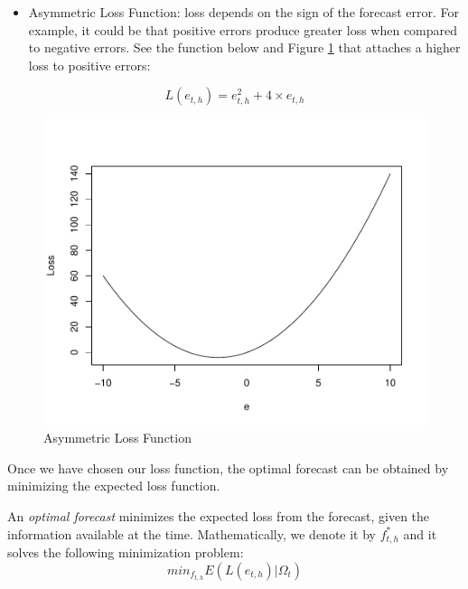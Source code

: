 \documentclass[]{book}
\providecommand{\tightlist}{%
  \setlength{\itemsep}{0pt}\setlength{\parskip}{0pt}}
\theoremstyle{definition}
\theoremstyle{definition}
\theoremstyle{definition}
\theoremstyle{remark}
\let\BeginKnitrBlock\begin \let\EndKnitrBlock\end
\begin{document}
\begin{itemize}
\tightlist
\item
  Asymmetric Loss Function: loss depends on the sign of the forecast error. For example, it could be that positive errors produce greater loss when compared to negative errors. See the function below and Figure \ref{fig:ch1-figure6} that attaches a higher loss to positive errors:
\end{itemize}

\begin{equation}
L(e_{t,h})=e_{t,h}^2+4 \times e_{t,h}
\end{equation}

\begin{figure}

{\centering \includegraphics[width=0.8\linewidth]{bookdown-demo_files/figure-latex/ch1-figure6-1} 

}

\caption{Asymmetric Loss Function}\label{fig:ch1-figure6}
\end{figure}

Once we have chosen our loss function, the optimal forecast can be obtained by minimizing the expected loss function.

\BeginKnitrBlock{definition}[Optimal Forecast]
\protect\hypertarget{def:d6}{}{\label{def:d6} {} }
\EndKnitrBlock{definition}

An \emph{optimal forecast} minimizes the expected loss from the forecast, given the information available at the time. Mathematically, we denote it by \(f^*_{t,h}\) and it solves the following minimization problem:
\begin{equation}
min_{f_{t,h}} E(L(e_{t,h})|\Omega_t)
\end{equation}
\end{document}
